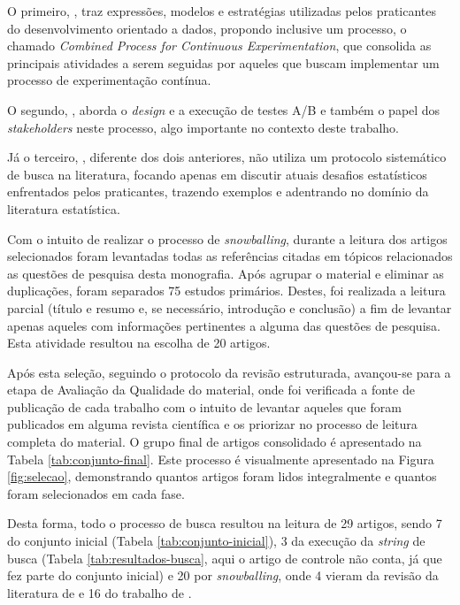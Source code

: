 O primeiro, , traz expressões, modelos e estratégias utilizadas pelos praticantes do desenvolvimento orientado a dados, propondo inclusive um processo, o chamado \textit{Combined Process for Continuous Experimentation}, que consolida as principais atividades a serem seguidas por aqueles que buscam implementar um processo de experimentação contínua.

O segundo, , aborda o  \textit{design} e a execução de testes A/B e também o papel dos \textit{stakeholders} neste processo, algo importante no contexto deste trabalho. 

Já o terceiro, , diferente dos dois anteriores, não utiliza um protocolo sistemático de busca na literatura, focando apenas em discutir atuais desafios estatísticos enfrentados pelos praticantes, trazendo exemplos e adentrando no domínio da literatura estatística.

Com o intuito de realizar o processo de \textit{snowballing}, durante a leitura dos artigos selecionados foram levantadas todas as referências citadas em tópicos relacionados as questões de pesquisa desta monografia. Após agrupar o material e eliminar as duplicações, foram separados 75 estudos primários. Destes, foi realizada a leitura parcial (título e resumo e, se necessário, introdução e conclusão) a fim de levantar apenas aqueles com informações pertinentes a alguma das questões de pesquisa. Esta atividade resultou na escolha de 20 artigos.

Após esta seleção, seguindo o protocolo da revisão estruturada, avançou-se para a etapa de Avaliação da Qualidade do material, onde foi verificada a fonte de publicação de cada trabalho com o intuito de levantar aqueles que foram publicados em alguma revista científica e os priorizar no processo de leitura completa do material. O grupo final de artigos consolidado é apresentado na Tabela \ref{tab:conjunto-final}. Este processo é visualmente apresentado na Figura \ref{fig:selecao}, demonstrando quantos artigos foram lidos integralmente e quantos foram selecionados em cada fase.

Desta forma, todo o processo de busca resultou na leitura de 29 artigos, sendo 7 do conjunto inicial (Tabela \ref{tab:conjunto-inicial}), 3 da execução da \textit{string} de busca (Tabela \ref{tab:resultados-busca}, aqui o artigo de controle não conta, já que fez parte do conjunto inicial) e 20 por \textit{snowballing}, onde 4 vieram da revisão da literatura de  \cite{yu_new_2020} \cite{chen_automatic_2018} \cite{fabijan_benefits_2017} \cite{le_goues_towards_2014} e 16 do trabalho de  \cite{kuhrmann_activity_2018} \cite{bures_infrastructure_2021} \cite{kevic_characterizing_2017} \cite{liu_enterprise-level_2019} \cite{olsson_opinions_2014} \cite{fernandes_hitting_2015} \cite{melegati_hypotheses_2019} \cite{kohavi_online_2013} \cite{crook_seven_2009} \cite{issa_mattos_hurrier_2023} \cite{fabijan_online_2020} \cite{fagerholm_right_2017} \cite{fabijan_three_2019} \cite{olsson_towards_2015} \cite{sauvola_towards_2015} \cite{melegati_understanding_2021}.

